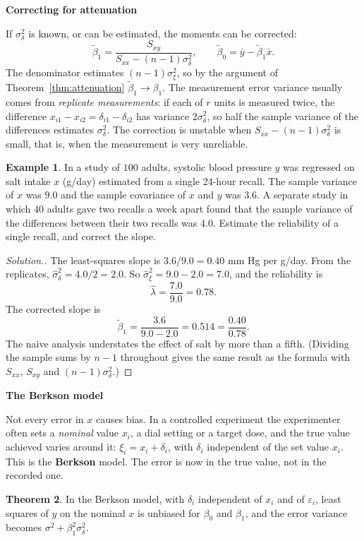 \documentclass[11pt,a4paper]{article}
\numberwithin{equation}{section}
\theoremstyle{definition}
\newtheorem{thm}{Theorem}[subsection]
\newtheorem{exa}[thm]{Example}
\newenvironment{solution}
  {\renewcommand{\qedsymbol}{}\begin{proof}[\textit{Solution}.]}
  {\end{proof}}
\newcommand{\subhead}[1]{%
  \par\medskip\noindent\textbf{#1}\par\nobreak\smallskip}
\begin{document}
\subhead{Correcting for attenuation}
If $\sigma_\delta^2$ is known, or can be estimated, the moments can be corrected:
\[
\tilde\beta_1 = \frac{S_{xy}}{S_{xx} - (n - 1)\sigma_\delta^2} , \qquad \tilde\beta_0 = \bar y - \tilde\beta_1\bar x .
\]
The denominator estimates $(n - 1)\sigma_\xi^2$, so by the argument of Theorem~\ref{thm:attenuation} $\tilde\beta_1 \to \beta_1$. The measurement
error variance usually comes from \emph{replicate measurements}: if each of $r$ units is measured twice, the
difference $x_{i1} - x_{i2} = \delta_{i1} - \delta_{i2}$ has variance $2\sigma_\delta^2$, so half the sample variance of the differences estimates
$\sigma_\delta^2$. The correction is unstable when $S_{xx} - (n - 1)\sigma_\delta^2$ is small, that is, when the measurement is very unreliable.

\begin{exa}\label{exa:attenuation}
In a study of $100$ adults, systolic blood pressure $y$ was regressed on salt intake $x$ (g/day) estimated from a
single 24-hour recall. The sample variance of $x$ was $9.0$ and the sample covariance of $x$ and $y$ was $3.6$. A
separate study in which $40$ adults gave two recalls a week apart found that the sample variance of the
differences between their two recalls was $4.0$. Estimate the reliability of a single recall, and correct the slope.
\end{exa}

\begin{solution}
The least-squares slope is $3.6/9.0 = 0.40$ mm Hg per g/day. From the replicates, $\hat\sigma_\delta^2 = 4.0/2 = 2.0$. So
$\hat\sigma_\xi^2 = 9.0 - 2.0 = 7.0$, and the reliability is
\[
\hat\lambda = \frac{7.0}{9.0} = 0.78 .
\]
The corrected slope is
\[
\tilde\beta_1 = \frac{3.6}{9.0 - 2.0} = 0.514 = \frac{0.40}{0.78} .
\]
The naive analysis understates the effect of salt by more than a fifth. (Dividing the sample sums by $n - 1$
throughout gives the same result as the formula with $S_{xx}$, $S_{xy}$ and $(n - 1)\sigma_\delta^2$.)
\end{solution}

\subhead{The Berkson model}
Not every error in $x$ causes bias. In a controlled experiment the experimenter often sets a \emph{nominal}
value $x_i$, a dial setting or a target dose, and the true value achieved varies around it: $\xi_i = x_i + \delta_i$, with $\delta_i$
independent of the set value $x_i$. This is the \textbf{Berkson} model. The error is now in the true value, not in
the recorded one.

\begin{thm}\label{thm:berkson}
In the Berkson model, with $\delta_i$ independent of $x_i$ and of $\varepsilon_i$, least squares of $y$ on the nominal $x$ is unbiased for $\beta_0$
and $\beta_1$, and the error variance becomes $\sigma^2 + \beta_1^2\sigma_\delta^2$.
\end{thm}
\end{document}

